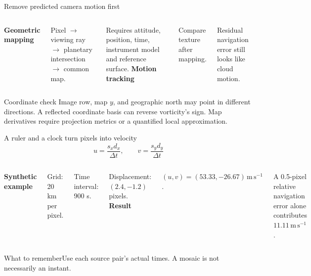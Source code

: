 \documentclass[aspectratio=169,11pt]{beamer}
\newcommand{\prov}{}
\newcommand{\evidence}[1]{\gdef\prov{#1}}
\newcommand{\takeaway}[1]{\vspace{0.3em}\begin{block}{What to remember}#1\end{block}}
\newcommand{\ms}{\mathrm{m\,s^{-1}}}
\begin{document}
\evidence{Original geometry explanation; repository basis caveats are described in the companion notes.}
\begin{frame}{Remove predicted camera motion first}
 \begin{columns}[T]
 \textbf{Geometric mapping}\par\medskip
 Pixel $\to$ viewing ray $\to$ planetary intersection $\to$ common map.
 \par\medskip
 Requires attitude, position, time, instrument model and reference surface.
 \textbf{Motion tracking}\par\medskip
 Compare texture after mapping.
 \par\medskip
 Residual navigation error still looks like cloud motion.
 \end{columns}
 \vspace{0.5cm}
 \begin{block}{Coordinate check}
 Image row, map $y$, and geographic north may point in different directions.
 A reflected coordinate basis can reverse vorticity's sign.
 Map derivatives require projection metrics or a quantified local approximation.
 \end{block}
\end{frame}

\evidence{Original worked example; values are synthetic, not new Jupiter measurements.}
\begin{frame}{A ruler and a clock turn pixels into velocity}
 \[
  u=\frac{s_xd_x}{\Delta t},\qquad v=\frac{s_yd_y}{\Delta t}
 \]
 \begin{columns}[T]
 \textbf{Synthetic example}\par
 Grid: 20 km per pixel.\par
 Time interval: 900 s.\par
 Displacement: $(2.4,-1.2)$ pixels.
 \textbf{Result}\par
 $(u,v)=(53.33,-26.67)\,\ms$.\par\medskip
 A 0.5-pixel relative navigation error alone contributes
 $11.11\,\ms$.
 \end{columns}
 \takeaway{Use each source pair's actual times. A mosaic is not necessarily an instant.}
\end{frame}
\end{document}
